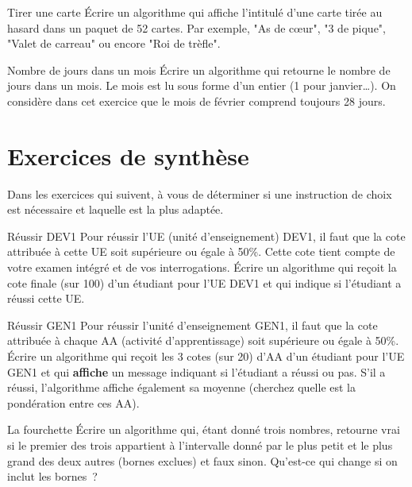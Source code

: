 	\begin{Exercice}{Tirer une carte}
		Écrire un algorithme qui affiche l’intitulé d’une carte
		tirée au hasard dans un paquet de 52 cartes.
		Par exemple, "As de cœur", "3 de pique", "Valet de carreau"
		ou encore "Roi de trèfle".
	\end{Exercice}
	
	\begin{Exercice}{Nombre de jours dans un mois}
		Écrire un algorithme qui retourne le nombre de jours dans un mois. 
		Le mois est lu sous forme d’un entier (1 pour janvier\dots).
		On considère dans cet exercice que le mois de février
		comprend toujours 28 jours.
	\end{Exercice}
		
\section{Exercices de synthèse}

	Dans les exercices qui suivent,
	à vous de déterminer si une instruction de choix est nécessaire
	et laquelle est la plus adaptée.

	\begin{Exercice}{Réussir DEV1}
		Pour réussir l’UE (unité d’enseignement) DEV1,
		il faut que la cote attribuée à cette UE 
		soit supérieure ou égale à 50\%.
		Cette cote tient compte de votre examen intégré
		et de vos interrogations.
		Écrire un algorithme 
		qui reçoit la cote finale (sur 100)
		d’un étudiant pour l’UE DEV1
		et qui indique si l’étudiant a réussi cette UE.
	\end{Exercice}		

	\begin{Exercice}{Réussir GEN1}
		\label{algo:réussirGEN1}
		Pour réussir l’unité d’enseignement GEN1,
		il faut que la cote attribuée à chaque AA (activité d’apprentissage)
		soit supérieure ou égale à 50\%.
		Écrire un algorithme qui reçoit les 3 cotes (sur 20) d’AA d’un étudiant
		pour l’UE GEN1 et qui \textbf{affiche} un message
		indiquant si l’étudiant a réussi ou pas.
		S’il a réussi, l’algorithme affiche également sa moyenne
		(cherchez quelle est la pondération entre ces AA).
	\end{Exercice}		
	
	\begin{Exercice}{La fourchette}
		Écrire un algorithme qui, étant donné trois nombres, 
		retourne vrai si le premier des trois 
		appartient à l’intervalle donné par le plus petit et le plus grand 
		des deux autres (bornes exclues) et faux sinon. 
		Qu’est-ce qui change si on inclut les bornes~?
	\end{Exercice}


